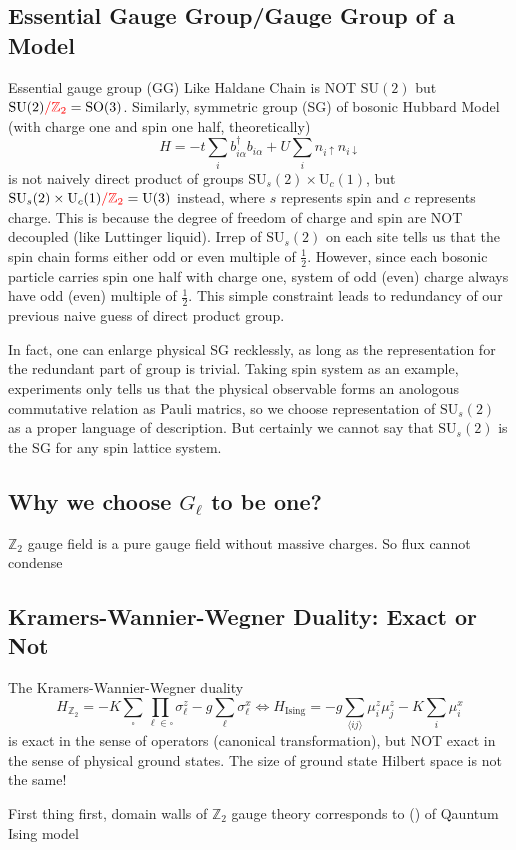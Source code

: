 \documentclass[10pt,nofootinbib]{revtex4}
\begin{document}
	\subsection{Essential Gauge Group/Gauge Group of a Model}
	Essential gauge group (GG) Like Haldane Chain is NOT $\mathrm{SU}(2)$ but $\mathrm{SU}(2){\color{red}/\mathbb{Z}_2}=\mathrm{SO}(3)$. Similarly, symmetric group (SG) of bosonic Hubbard Model (with charge one and spin one half, theoretically)
	\begin{equation*}
		H=-t\sum_i b_{i \alpha}^\dagger b_{i \alpha}+U\sum_i n_{i\uparrow}n_{i\downarrow}	
	\end{equation*}
	is not naively direct product of groups $\mathrm{SU}_{s}(2)\times\mathrm{U}_{c}(1)$, but $\mathrm{SU}_{s}(2)\times\mathrm{U}_{c}(1){\color{red}/\mathbb{Z}_2}=\mathrm{U}(3)$ instead, where $s$ represents spin and $c$ represents charge. This is because the degree of freedom of charge and spin are NOT decoupled (like Luttinger liquid). Irrep of $\mathrm{SU}_s(2)$ on each site tells us that the spin chain forms either odd or even multiple of $\frac{1}{2}$. However, since each bosonic particle carries spin one half with charge one, system of odd (even) charge always have odd (even) multiple of $\frac12$. This simple constraint leads to redundancy of our previous naive guess of direct product group.\par
	In fact, one can enlarge physical SG recklessly, as long as the representation for the redundant part of group is trivial. Taking spin system as an example, experiments only tells us that the physical observable forms an anologous commutative relation as Pauli matrics, so we choose representation of $\mathrm{SU}_s(2)$ as a proper language of description. But certainly we cannot say that $\mathrm{SU}_s(2)$ is the SG for any spin lattice system.

	\subsection{Why we choose $G_\ell$ to be one?}
		$\mathbb{Z}_2$ gauge field is a pure gauge field without massive charges. So flux cannot condense 


	\subsection{Kramers-Wannier-Wegner Duality: Exact or Not}
		The Kramers-Wannier-Wegner duality
		\begin{equation*}
			H_{\mathbb{Z}_2}=-K\sum_{\square}\prod_{\ell\in\square}\sigma_\ell^z-g\sum_\ell\sigma_\ell^x\Longleftrightarrow H_{\text{Ising}}=-g\sum_{\langle ij \rangle}\mu_i^z\mu_j^z-K\sum_i\mu_i^x
		\end{equation*}
		is exact in the sense of operators (canonical transformation), but NOT exact in the sense of physical ground states. The size of ground state Hilbert space is not the same!\par
		First thing first, domain walls of $\mathbb{Z}_2$ gauge theory corresponds to () of Qauntum Ising model
\end{document}
